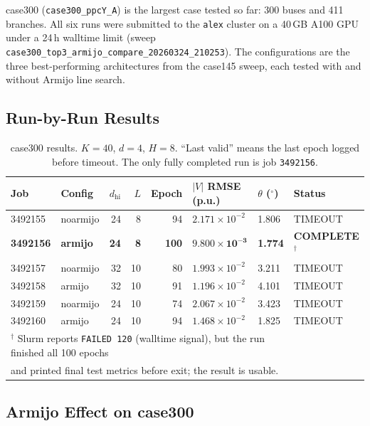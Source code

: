 \documentclass{article}
\begin{document}
case300 (\texttt{case300\_ppcY\_A}) is the largest case tested so far:
300 buses and 411 branches.  All six runs were submitted to the \texttt{alex}
cluster on a 40\,GB A100 GPU under a 24\,h walltime limit
(sweep \texttt{case300\_top3\_armijo\_compare\_20260324\_210253}).
The configurations are the three best-performing architectures from the
case145 sweep, each tested with and without Armijo line search.

\subsection{Run-by-Run Results}

\begin{table}[h]
\centering
\small
\caption{case300 results. $K=40$, $d=4$, $H=8$.
  ``Last valid'' means the last epoch logged before timeout.
  The only fully completed run is job \texttt{3492156}.}
\label{tab:case300}
\setlength{\tabcolsep}{4pt}
\begin{tabular}{llrrrlll}
\toprule
Job & Config & $d_{\mathrm{hi}}$ & $L$ & Epoch & $|V|$ RMSE (p.u.) & $\theta$ (${}^\circ$) & Status \\
\midrule
3492155 & noarmijo & 24 & 8  & 94  & $2.171\times10^{-2}$ & 1.806 & TIMEOUT \\
\textbf{3492156} & \textbf{armijo}   & \textbf{24} & \textbf{8}  & \textbf{100} & $\mathbf{9.800\times10^{-3}}$ & \textbf{1.774} & \textbf{COMPLETE}$^\dagger$ \\
3492157 & noarmijo & 32 & 10 & 80  & $1.993\times10^{-2}$ & 3.211 & TIMEOUT \\
3492158 & armijo   & 32 & 10 & 91  & $1.196\times10^{-2}$ & 4.101 & TIMEOUT \\
3492159 & noarmijo & 24 & 10 & 74  & $2.067\times10^{-2}$ & 3.423 & TIMEOUT \\
3492160 & armijo   & 24 & 10 & 94  & $1.468\times10^{-2}$ & 1.825 & TIMEOUT \\
\bottomrule
\multicolumn{7}{l}{${}^\dagger$ Slurm reports \texttt{FAILED 120} (walltime signal), but the run finished all 100 epochs}\\
\multicolumn{7}{l}{\phantom{${}^\dagger$} and printed final test metrics before exit; the result is usable.}\\
\end{tabular}
\end{table}

\subsection{Armijo Effect on case300}
\end{document}
